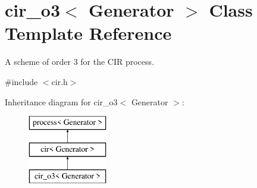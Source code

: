 \hypertarget{classcir__o3}{}\section{cir\+\_\+o3$<$ Generator $>$ Class Template Reference}
\label{classcir__o3}


A scheme of order 3 for the C\+IR process.  




{\ttfamily \#include $<$cir.\+h$>$}

Inheritance diagram for cir\+\_\+o3$<$ Generator $>$\+:\begin{figure}[H]
\begin{center}
\leavevmode
\includegraphics[height=3.000000cm]{classcir__o3}
\end{center}
\end{figure}
